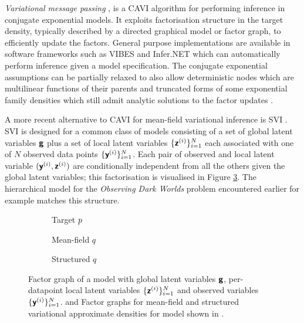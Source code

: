 \emph{Variational message passing} \citep{winn2005variational}, is a \ac{CAVI} algorithm for performing inference in conjugate exponential models. It exploits factorisation structure in the target density, typically described by a directed graphical model or factor graph, to efficiently update the factors. General purpose implementations are available in software frameworks such as VIBES \citep{bishop2002vibes} and Infer.NET \citep{minka2014infer} which can automatically perform inference given a model specification. The conjugate exponential assumptions can be partially relaxed to also allow deterministic nodes which are multilinear functions of their parents and truncated forms of some exponential family densities which still admit analytic solutions to the factor updates \citep{winn2005variational}.

A more recent alternative to \ac{CAVI} for mean-field variational inference is \ac{SVI} \citep{hoffman2013stochastic,sato2001online}. \ac{SVI} is designed for a common class of models consisting of a set of global latent variables $\boldsymbol{\mathsf{g}}$ plus a set of local latent variables $\lbrace \boldsymbol{\mathsf{z}}^{(i)}\rbrace_{i=1}^N$ each associated with one of $N$ observed data points $\lbrace \boldsymbol{\mathsf{y}}^{(i)}\rbrace_{i=1}^N$. Each pair of observed and local latent variable $(\boldsymbol{\mathsf{y}}^{(i)},\boldsymbol{\mathsf{z}}^{(i)})$ are conditionally independent from all the others given the global latent variables; this factorisation is visualised in Figure \ref{sfig:global-local-latent-structured-q-factor-graph}. The hierarchical model for the \emph{Observing Dark Worlds} problem encountered earlier for example matches this structure.

\begin{figure}[t]
\centering
\begin{subfigure}[b]{.32\linewidth}
\centering
{}
\caption{Target $p$}
\label{sfig:global-local-latent-model-factor-graph}
\end{subfigure}
\begin{subfigure}[b]{.32\linewidth}
\centering
{}
\caption{Mean-field $q$}
\label{sfig:global-local-latent-mean-field-q-factor-graph}
\end{subfigure}
\begin{subfigure}[b]{.32\linewidth}
\centering
{}
\caption{Structured $q$}
\label{sfig:global-local-latent-structured-q-factor-graph}
\end{subfigure}
\caption[Global-local latent variable model factor graph.]{ Factor graph of a model with global latent variables $\boldsymbol{\mathsf{g}}$, per-datapoint local latent variables $\lbrace \boldsymbol{\mathsf{z}}^{(i)}\rbrace_{i=1}^N$ and observed variables $\lbrace \boldsymbol{\mathsf{y}}^{(i)}\rbrace_{i=1}^N$.  and  Factor graphs for mean-field and structured variational approximate densities for model shown in .}
\label{fig:global-local-latent-factor-graphs}
\end{figure}

